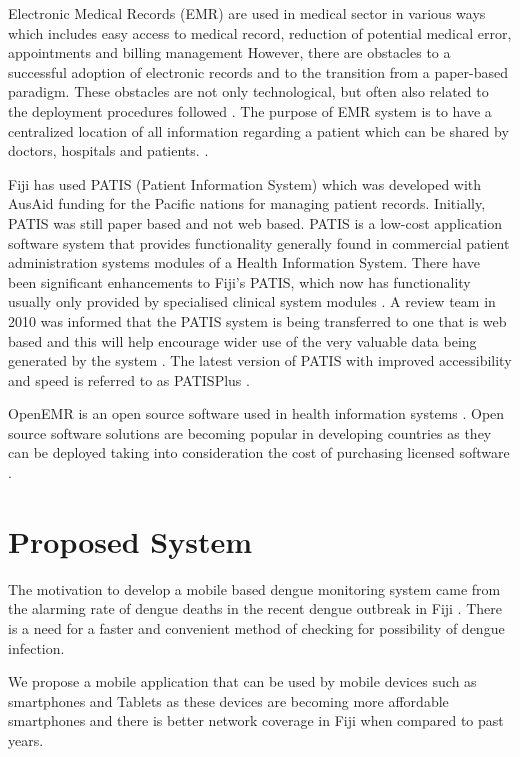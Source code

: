 \documentclass[runningheads,a4paper]{llncs}
\begin{document}
Electronic Medical Records (EMR) are used in medical sector in various ways which includes easy access to medical record, reduction of potential medical error, appointments  and billing management \cite{Park2012204} However, there are obstacles to a successful adoption of electronic records and to the transition from a paper-based paradigm. These obstacles are not only technological, but often also related to the deployment procedures followed \cite{Oliveira2013} \cite{Scholl2011}.  The purpose of EMR  system is to have a centralized location of all information regarding a patient which can be shared by doctors, hospitals and patients. \cite{Hatton2012706}.  

Fiji has used PATIS (Patient Information System) which was developed with AusAid funding for the Pacific nations for managing patient records. Initially, PATIS was still paper based and not web based. PATIS is a low-cost application software system that provides functionality generally found in commercial patient administration systems modules of a Health Information System. There have been significant enhancements to Fiji's PATIS, which now has functionality usually only provided by specialised clinical system modules \cite{Soar2012}. A review team in 2010 was informed that the PATIS system is being transferred to one that is web based and this will help encourage wider use of the very valuable data being generated by the system \cite{Freeman2010}. The latest version of PATIS with improved accessibility and speed is referred to as PATISPlus \cite{FijiMOH2014}.

OpenEMR is an open source software used in health information systems \cite{Feufel2011e85} \cite{Ford2006106}. Open source software solutions are becoming popular in developing countries as they can be deployed taking into consideration the cost of purchasing licensed software \cite{Kiah2014} \cite{WikipediaOpenSource}.

\section{Proposed System}

The motivation to develop a mobile based dengue monitoring system came from the alarming rate of dengue deaths in the recent dengue outbreak in Fiji \cite{Sauvakacolo2014}. There is a need for a faster and convenient method of checking for possibility of dengue infection.   

We propose a mobile application that can be used by mobile devices such as  smartphones and Tablets as these devices are becoming  more affordable smartphones and there is better network coverage in Fiji when compared to past years.
\end{document}
